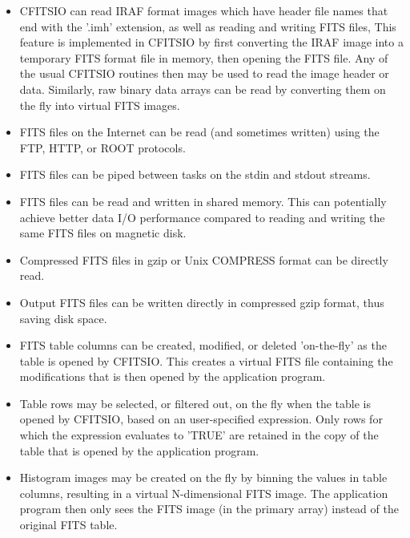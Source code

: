 \documentclass[11pt]{book}
\begin{document}
\begin{itemize}
\item
CFITSIO can read IRAF format images which have header file names that
end with the '.imh' extension, as well as reading and writing FITS
files,   This feature is implemented in CFITSIO by first converting the
IRAF image into a temporary FITS format file in memory, then opening
the FITS file.  Any of the usual CFITSIO routines then may be used to
read the image header or data.  Similarly, raw binary data arrays can
be read by converting them on the fly into virtual FITS images.

\item
FITS files on the Internet can be read (and sometimes written) using the FTP,
HTTP, or ROOT protocols.

\item
FITS files can be piped between tasks on the stdin and stdout streams.

\item
FITS files can be read and written in shared memory.  This can
potentially achieve better data I/O performance compared to reading and
writing the same FITS files on magnetic disk.

\item
Compressed FITS files in gzip or Unix COMPRESS format can be directly read.

\item
Output FITS files can be written directly in compressed gzip format,
thus saving disk space.

\item
FITS table columns can be created, modified, or deleted 'on-the-fly' as
the table is opened by CFITSIO.  This creates a virtual FITS file containing
the modifications that is then opened by the application program.

\item
Table rows may be selected, or filtered out, on the fly when the table
is opened by CFITSIO, based on an user-specified expression.
Only rows for which the expression evaluates to 'TRUE' are retained
in the copy of the table that is opened by the application program.

\item
Histogram images may be created on the fly by binning the values in
table columns, resulting in a virtual N-dimensional FITS image.  The
application program then only sees the FITS image (in the primary
array) instead of the original FITS table.
\end{itemize}
\end{document}

